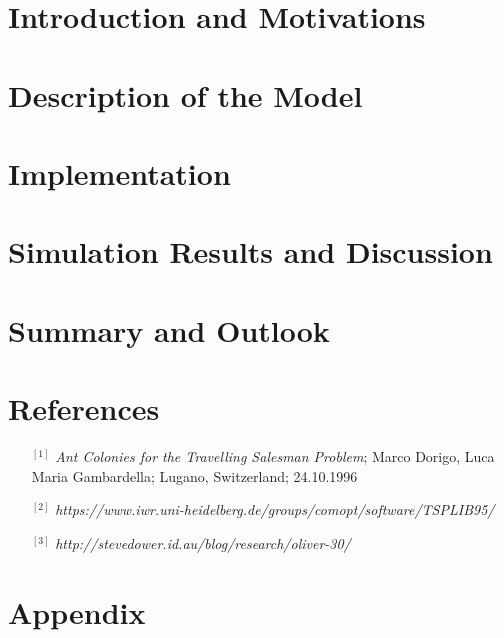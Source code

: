 \documentclass[11pt]{article}
\begin{document}
\section{Introduction and Motivations}


\section{Description of the Model}
\label{sec:model}


\section{Implementation}

\section{Simulation Results and Discussion}


\label{sec:results}
\section{Summary and Outlook}

\newpage
\section{References}

\begin{itemize}

\item[$^{[1]}$] \textit{Ant Colonies for the Travelling Salesman Problem}; Marco Dorigo, Luca Maria Gambardella; Lugano, Switzerland; 24.10.1996\\
\item[$^{[2]}$] \textit{https://www.iwr.uni-heidelberg.de/groups/comopt/software/TSPLIB95/}
\item[$^{[3]}$] \textit{http://stevedower.id.au/blog/research/oliver-30/}

\end{itemize}



\section*{Appendix}
\end{document}
